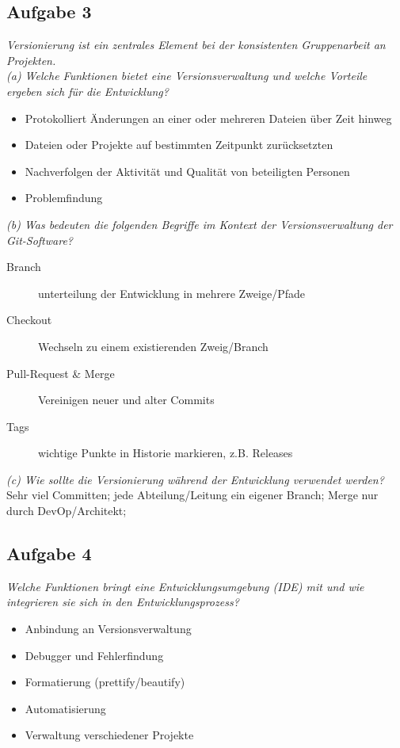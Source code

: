 \documentclass{article}
\begin{document}
\subsection{Aufgabe 3}
\textit{Versionierung ist ein zentrales Element bei der konsistenten Gruppenarbeit an Projekten.}\\
\textit{(a) Welche Funktionen bietet eine Versionsverwaltung und welche Vorteile ergeben sich für die Entwicklung?}\\
\begin{itemize}
    \item Protokolliert Änderungen an einer oder mehreren Dateien über Zeit hinweg
    \item Dateien oder Projekte auf bestimmten Zeitpunkt zurücksetzten
    \item Nachverfolgen der Aktivität und Qualität von beteiligten Personen
    \item Problemfindung
\end{itemize}

\textit{(b) Was bedeuten die folgenden Begriffe im Kontext der Versionsverwaltung der Git-Software?}\\
\begin{description}
    \item[Branch] unterteilung der Entwicklung in mehrere Zweige/Pfade
    \item[Checkout] Wechseln zu einem existierenden Zweig/Branch
    \item[Pull-Request \& Merge] Vereinigen neuer und alter Commits
    \item[Tags] wichtige Punkte in Historie markieren, z.B. Releases
\end{description}

\textit{(c) Wie sollte die Versionierung während der Entwicklung verwendet werden?}\\
Sehr viel Committen; jede Abteilung/Leitung ein eigener Branch; Merge nur durch DevOp/Architekt;

\subsection{Aufgabe 4}
\textit{Welche Funktionen bringt eine Entwicklungsumgebung (IDE) mit und wie integrieren sie sich in den Entwicklungsprozess?}
\begin{itemize}
    \item Anbindung an Versionsverwaltung
    \item Debugger und Fehlerfindung
    \item Formatierung (prettify/beautify)
    \item Automatisierung
    \item Verwaltung verschiedener Projekte
\end{itemize}
\end{document}
